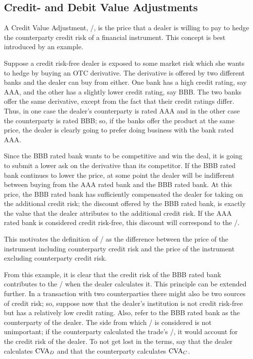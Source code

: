 \documentclass[main.tex]{subfiles}
\begin{document}
    \subsection{Credit- and Debit Value Adjustments}
        A Credit Value Adjustment, \CVA/, is the price that a dealer is willing to pay 
        to hedge the counterparty credit risk of a financial instrument.
        This concept is best introduced by an example. 
        
        \begin{example}
            Suppose a credit risk-free dealer is exposed to some market risk 
            which she wants to hedge by buying an OTC derivative.
            The derivative is offered by two different banks and the dealer can buy from either.
            One bank has a high credit rating, say AAA, and the other has a slightly lower credit rating, say BBB. 
            The two banks offer the same derivative, except from the fact that their credit ratings differ.
            Thus, in one case the dealer's counterparty is rated AAA and in the other case the counterparty is rated BBB;
            so, if the banks offer the product at the same price, 
            the dealer is clearly going to prefer doing business with the bank rated AAA.

            Since the BBB rated bank wants to be competitive and win the deal,
            it is going to submit a lower ask on the derivative than its competitor.
            If the BBB rated bank continues to lower the price, 
            at some point the dealer will be indifferent between buying 
            from the AAA rated bank and the BBB rated bank.
            At this price, the BBB rated bank has sufficiently compensated the dealer for taking on the additional credit risk;
            the discount offered by the BBB rated bank, 
            is exactly the value that the dealer attributes to the additional credit risk. 
            If the AAA rated bank is considered credit risk-free, this discount will correspond to the \CVA/.

            This motivates the definition of \CVA/ as the difference between the price of the instrument 
            including counterparty credit risk and the price of the instrument excluding counterparty credit risk.
        \end{example}

        From this example, it is clear that the credit risk of the BBB rated bank contributes to the \CVA/
        when the dealer calculates it.
        This principle can be extended further.
        In a transaction with two counterparties there might also be two sources of credit risk;
        so, suppose now that the dealer's institution is not credit risk-free 
        but has a relatively low credit rating.
        Also, refer to the BBB rated bank as the counterparty of the dealer.
        The side from which \CVA/ is considered is not unimportant;
        if the counterparty calculated the trade's \CVA/, it would account for the credit risk of the dealer.
        To not get lost in the terms, say that the dealer calculates $\CVA/_{D}$ 
        and that the counterparty calculates $\CVA/_{C}$.
\end{document}
